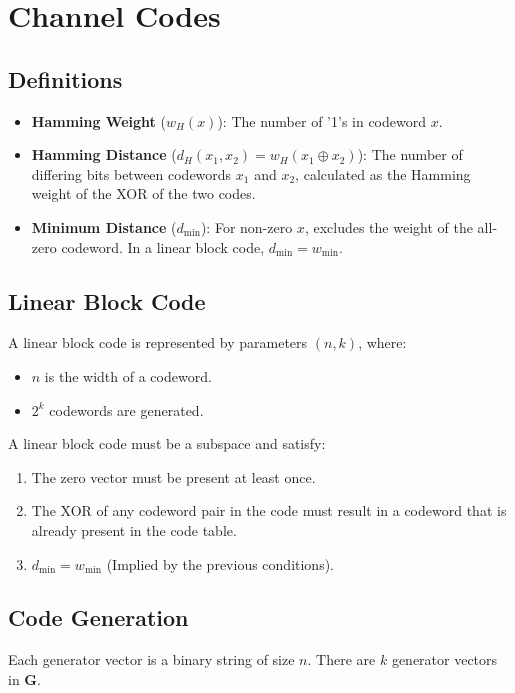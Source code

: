 \documentclass[10pt]{article}
\begin{document}
\section{Channel Codes}

\subsection{Definitions}
\begin{itemize}
    \item \textbf{Hamming Weight} ($w_H(x)$): The number of '1's in codeword $x$.
    \item \textbf{Hamming Distance} ($d_H(x_1, x_2) = w_H(x_1 \oplus x_2)$): The number of differing bits between codewords $x_1$ and $x_2$, calculated as the Hamming weight of the XOR of the two codes.
    \item \textbf{Minimum Distance} ($d_{\text{min}}$): For non-zero $x$, excludes the weight of the all-zero codeword. In a linear block code, $d_{\text{min}} = w_{\text{min}}$.
\end{itemize}

\subsection{Linear Block Code}
A linear block code is represented by parameters $(n, k)$, where:
\begin{itemize}
    \item $n$ is the width of a codeword.
    \item $2^k$ codewords are generated.
\end{itemize}

A linear block code must be a subspace and satisfy:
\begin{enumerate}
    \item The zero vector must be present at least once.
    \item The XOR of any codeword pair in the code must result in a codeword that is already present in the code table.
    \item $d_{\text{min}} = w_{\text{min}}$ (Implied by the previous conditions).
\end{enumerate}

\subsection{Code Generation}
Each generator vector is a binary string of size $n$. There are $k$ generator vectors in $\mathbf{G}$.
\end{document}
